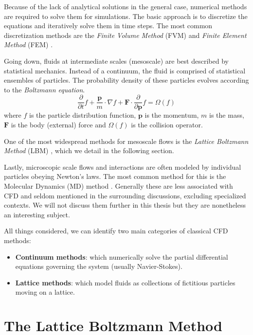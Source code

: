 Because of the lack of analytical solutions in the general case, numerical methods are required to solve them for simulations.
The basic approach is to discretize the equations and iteratively solve them in time steps.
The most common discretization methods are the \emph{Finite Volume Method} (FVM) and \emph{Finite Element Method} (FEM) \cite{blazek2015computational}.

Going down, fluids at intermediate scales (mesoscale) are best described by statistical mechanics. Instead of a continuum, the fluid is comprised of statistical ensembles of particles.
The probability density of these particles evolves according to the \emph{Boltzmann equation}.
\begin{equation*}
    \frac{\partial}{\partial t}f + \frac{\mathbf{p}}{m} \cdot \nabla f + \mathbf{F} \cdot \frac{\partial}{\partial \mathbf{p}}f = \Omega(f)
\end{equation*}
where $f$ is the particle distribution function, $\pmb{p}$ is the momentum, $m$ is the mass, $\pmb{F}$ is the body (external) force and $\Omega(f)$ is the collision operator.

One of the most widespread methods for mesoscale flows is the \emph{Lattice Boltzmann Method} (LBM) \cite{chen1998lattice}, which we detail in the following section.

Lastly, microscopic scale flows and interactions are often modeled by individual particles obeying Newton's laws. The most common method for this is the Molecular Dynamics (MD) method \cite{koplik1989molecular}.
Generally these are less associated with CFD and seldom mentioned in the surrounding discussions, excluding specialized contexts.
We will not discuss them further in this thesis but they are nonetheless an interesting subject.

All things considered, we can identify two main categories of classical CFD methods:
\begin{itemize}
    \item \textbf{Continuum methods}: which numerically solve the partial differential equations governing the system (usually Navier-Stokes).
    \item \textbf{Lattice methods}: which model fluids as collections of fictitious particles moving on a lattice.
\end{itemize}

\section{The Lattice Boltzmann Method}
\label{sec:lbm}

